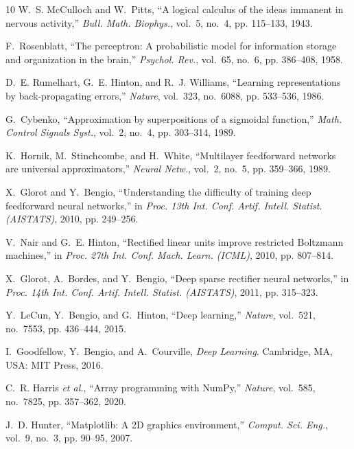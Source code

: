 \documentclass[10pt,letterpaper,twocolumn]{article}
\begin{document}
\balance
\begingroup\footnotesize
\begin{thebibliography}{10}
W.~S. McCulloch and W.~Pitts, ``A logical calculus of the ideas immanent in nervous activity,'' \emph{Bull. Math. Biophys.}, vol.~5, no.~4, pp. 115--133, 1943.

F.~Rosenblatt, ``The perceptron: A probabilistic model for information storage and organization in the brain,'' \emph{Psychol. Rev.}, vol.~65, no.~6, pp. 386--408, 1958.

D.~E. Rumelhart, G.~E. Hinton, and R.~J. Williams, ``Learning representations by back-propagating errors,'' \emph{Nature}, vol.~323, no.~6088, pp. 533--536, 1986.

G.~Cybenko, ``Approximation by superpositions of a sigmoidal function,'' \emph{Math. Control Signals Syst.}, vol.~2, no.~4, pp. 303--314, 1989.

K.~Hornik, M.~Stinchcombe, and H.~White, ``Multilayer feedforward networks are universal approximators,'' \emph{Neural Netw.}, vol.~2, no.~5, pp. 359--366, 1989.

X.~Glorot and Y.~Bengio, ``Understanding the difficulty of training deep feedforward neural networks,'' in \emph{Proc. 13th Int. Conf. Artif. Intell. Statist. (AISTATS)}, 2010, pp. 249--256.

V.~Nair and G.~E. Hinton, ``Rectified linear units improve restricted Boltzmann machines,'' in \emph{Proc. 27th Int. Conf. Mach. Learn. (ICML)}, 2010, pp. 807--814.

X.~Glorot, A.~Bordes, and Y.~Bengio, ``Deep sparse rectifier neural networks,'' in \emph{Proc. 14th Int. Conf. Artif. Intell. Statist. (AISTATS)}, 2011, pp. 315--323.

Y.~LeCun, Y.~Bengio, and G.~Hinton, ``Deep learning,'' \emph{Nature}, vol.~521, no.~7553, pp. 436--444, 2015.

I.~Goodfellow, Y.~Bengio, and A.~Courville, \emph{Deep Learning}. Cambridge, MA, USA: MIT Press, 2016.

C.~R. Harris \emph{et al.}, ``Array programming with NumPy,'' \emph{Nature}, vol.~585, no.~7825, pp. 357--362, 2020.

J.~D. Hunter, ``Matplotlib: A 2D graphics environment,'' \emph{Comput. Sci. Eng.}, vol.~9, no.~3, pp. 90--95, 2007.
\end{thebibliography}
\endgroup
\end{document}
